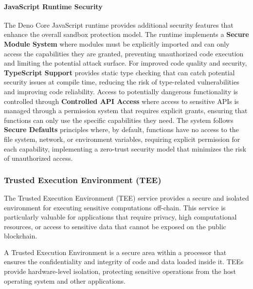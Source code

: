 \documentclass[12pt,a4paper]{article}
\begin{document}
\paragraph{JavaScript Runtime Security}
The Deno Core JavaScript runtime provides additional security features that enhance the overall sandbox protection model. The runtime implements a \textbf{Secure Module System} where modules must be explicitly imported and can only access the capabilities they are granted, preventing unauthorized code execution and limiting the potential attack surface. For improved code quality and security, \textbf{TypeScript Support} provides static type checking that can catch potential security issues at compile time, reducing the risk of type-related vulnerabilities and improving code reliability. Access to potentially dangerous functionality is controlled through \textbf{Controlled API Access} where access to sensitive APIs is managed through a permission system that requires explicit grants, ensuring that functions can only use the specific capabilities they need. The system follows \textbf{Secure Defaults} principles where, by default, functions have no access to the file system, network, or environment variables, requiring explicit permission for each capability, implementing a zero-trust security model that minimizes the risk of unauthorized access.

\subsubsection{Trusted Execution Environment (TEE)}
\label{subsubsec:tee}

The Trusted Execution Environment (TEE) service provides a secure and isolated environment for executing sensitive computations off-chain. This service is particularly valuable for applications that require privacy, high computational resources, or access to sensitive data that cannot be exposed on the public blockchain.



\begin{definition}
A Trusted Execution Environment is a secure area within a processor that ensures the confidentiality and integrity of code and data loaded inside it. TEEs provide hardware-level isolation, protecting sensitive operations from the host operating system and other applications.
\end{definition}
\end{document}
